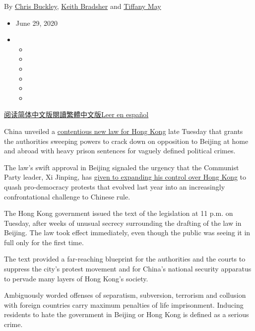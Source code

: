 By \href{https://www.nytimes.com/by/chris-buckley}{Chris Buckley},
\href{https://www.nytimes.com/by/keith-bradsher}{Keith Bradsher} and
\href{https://www.nytimes.com/by/tiffany-may}{Tiffany May}

\begin{itemize}
\item
  June 29, 2020
\item
  \begin{itemize}
  \item
  \item
  \item
  \item
  \item
  \item
  \end{itemize}
\end{itemize}

\href{https://cn.nytimes.com/china/20200630/china-hong-kong-security-law-rules/}{阅读简体中文版}\href{https://cn.nytimes.com/china/20200630/china-hong-kong-security-law-rules/}{閱讀繁體中文版}\href{https://www.nytimes.com/es/2020/06/30/espanol/mundo/hong-kong-china-leyes-seguridad.html}{Leer
en español}

China unveiled a
\href{https://www.nytimes.com/2020/07/07/business/hong-kong-security-law-tech.html}{contentious
new law for Hong Kong} late Tuesday that grants the authorities sweeping
powers to crack down on opposition to Beijing at home and abroad with
heavy prison sentences for vaguely defined political crimes.

The law's swift approval in Beijing signaled the urgency that the
Communist Party leader, Xi Jinping, has
\href{https://www.nytimes.com/2020/05/21/business/economy/coronavirus-china-economy.html}{given
to expanding his control over Hong Kong} to quash pro-democracy protests
that evolved last year into an increasingly confrontational challenge to
Chinese rule.

The Hong Kong government issued the text of the legislation at 11 p.m.
on Tuesday, after weeks of unusual secrecy surrounding the drafting of
the law in Beijing. The law took effect immediately, even though the
public was seeing it in full only for the first time.

The text provided a far-reaching blueprint for the authorities and the
courts to suppress the city's protest movement and for China's national
security apparatus to pervade many layers of Hong Kong's society.

Ambiguously worded offenses of separatism, subversion, terrorism and
collusion with foreign countries carry maximum penalties of life
imprisonment. Inducing residents to hate the government in Beijing or
Hong Kong is defined as a serious crime.

